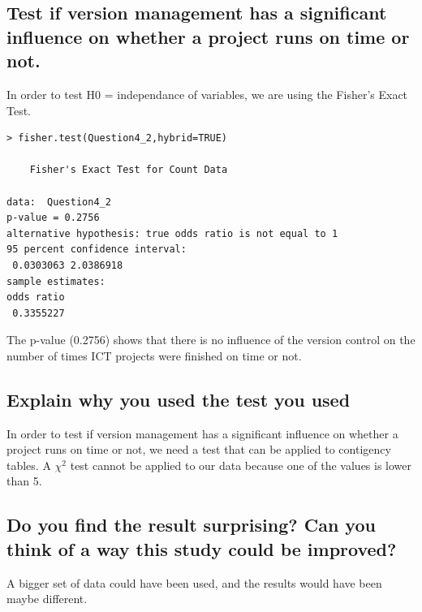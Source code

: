 \documentclass[12pt,a4paper]{scrartcl}
\begin{document}
\subsection{Test if version management has a significant influence on whether a project runs on time or not.}

In order to test H0 = independance of variables, we are using the Fisher's Exact Test.
\begin{lstlisting}[frame=single]
> fisher.test(Question4_2,hybrid=TRUE)

    Fisher's Exact Test for Count Data

data:  Question4_2
p-value = 0.2756
alternative hypothesis: true odds ratio is not equal to 1
95 percent confidence interval:
 0.0303063 2.0386918
sample estimates:
odds ratio 
 0.3355227 
\end{lstlisting}
The p-value (0.2756) shows that there is no influence of the version control on the number of times ICT projects were finished on time or not.

\subsection{Explain why you used the test you used}
In order to test if version management has a significant influence on whether a project runs on time or not, we need a test that can be applied to contigency tables. A     
 $ \chi^{2}$ test cannot be applied to our data because one of the values is lower than 5.

\subsection{Do you find the result surprising? Can you think of a way this study could be improved?}
A bigger set of data could have been used, and the results would have been maybe different.
\end{document}
